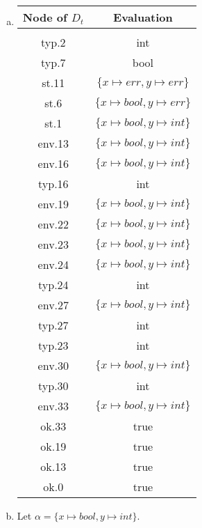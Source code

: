 %
%
%
\begin{solution}
  \begin{enumerate}[(a)]
    \item 
    \begin{center}
    	\begin{tabular}{c | c }
    		Node of $D_t$ & Evaluation \\
    		\hline\hline \\
    		typ.2 & int \\
    		typ.7 & bool \\
    		st.11 & $\{x \mapsto err, y \mapsto err\}$ \\
    		st.6 & $\{x \mapsto bool, y \mapsto err\}$ \\
    		st.1 & $\{x \mapsto bool, y \mapsto int\}$ \\
    		env.13 & $\{x \mapsto bool, y \mapsto int\}$ \\
    		env.16 & $\{x \mapsto bool, y \mapsto int\}$ \\
    		typ.16 & int \\
    		env.19 & $\{x \mapsto bool, y \mapsto int\}$ \\
    		env.22 & $\{x \mapsto bool, y \mapsto int\}$ \\
    		env.23 & $\{x \mapsto bool, y \mapsto int\}$ \\
    		env.24 & $\{x \mapsto bool, y \mapsto int\}$ \\
    		typ.24 & int \\
    		env.27 & $\{x \mapsto bool, y \mapsto int\}$ \\
    		typ.27 & int \\
    		typ.23 & int \\
    		env.30 & $\{x \mapsto bool, y \mapsto int\}$ \\
    		typ.30 & int \\
    		env.33 & $\{x \mapsto bool, y \mapsto int\}$ \\
    		ok.33 & true \\
    		ok.19 & true \\
    		ok.13 & true \\
    	     ok.0 & true
    	\end{tabular}
    \end{center}
    \item 
        Let $\alpha=\{x \mapsto bool, y \mapsto int\}$.

\end{enumerate}
\end{solution}
